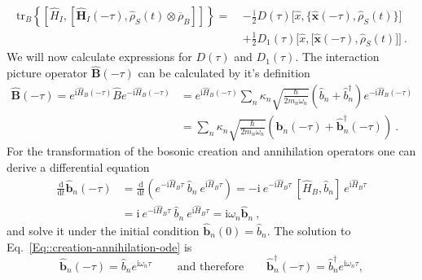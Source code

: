 	\begin{equation}
		\begin{split}
			\text{tr}_B \left\{  \left[{\hat{H}}_I, \left[{\boldsymbol{\hat{H}}}_I(- \tau), {\hat{\rho}}_S(t) \otimes \overline{\rho}_B \right]\right]  \right\} =	~&-\frac{\mathrm{i}}{2} D(\tau) \Big[\hat{x}, \big\{\boldsymbol{\hat{x}}(-\tau),  \hat{\rho}_S(t)\big\}\Big] \\
			&+ \frac{1}{2} D_1(\tau) \Big[\hat{x}, \big[\boldsymbol{\hat{x}}(-\tau),  \hat{\rho}_S(t)\big] \Big]~.
		\end{split}
	\end{equation}
	We will now calculate expressions for $D(\tau)$ and $D_1(\tau)$. The interaction picture operator $\boldsymbol{\hat{B}}(-\tau)$ can be calculated by it's definition
	\begin{equation}
		\begin{split}
			\boldsymbol{\hat{B}}(-\tau) =	e^{\mathrm{i} \hat{H}_B (-\tau)} \hat{B} e^{- \mathrm{i} \hat{H}_B (-\tau)} &=	 e^{\mathrm{i} \hat{H}_B (-\tau)} \sum_n \kappa_n \sqrt{\frac{\hbar}{2 m_n \omega_n}} \left(\hat{b}_n + \hat{b}_n^\dagger\right) e^{- \mathrm{i} \hat{H}_B (-\tau)} \\
			&=	\sum_n \kappa_n \sqrt{\frac{\hbar}{2 m_n \omega_n}} \left(\boldsymbol{\hat{b}}_n(-\tau) + \boldsymbol{\hat{b}}_n^\dagger(-\tau) \right)~.
		\end{split}
	\end{equation}
	For the transformation of the bosonic creation and annihilation operators one can derive a differential equation
	\begin{equation} \label{Eq::creation-annihilation-ode}
		\begin{split}
			\frac{\text{d}}{\text{d}t} \boldsymbol{\hat{b}}_n(-\tau) &=	\frac{\text{d}}{\text{d}t} \left(e^{- \mathrm{i} \hat{H}_B \tau}~ \hat{b}_n~e^{ \mathrm{i} \hat{H}_B \tau}\right) = -\mathrm{i}~e^{- \mathrm{i} \hat{H}_B \tau}~ \left[\hat{H}_B, \hat{b}_n\right]~e^{\mathrm{i} \hat{H}_B \tau} \\
			&=	\mathrm{i}~e^{- \mathrm{i} \hat{H}_B \tau}~ \hat{b}_n~e^{\mathrm{i} \hat{H}_B \tau}  =	\mathrm{i}\omega_n \boldsymbol{\hat{b}}_n~,
		\end{split}
	\end{equation}
	and solve it under the initial condition $\boldsymbol{\hat{b}}_n(0) = \hat{b}_n	$. The solution to Eq.~\eqref{Eq::creation-annihilation-ode} is
	\begin{equation}
		\boldsymbol{\hat{b}}_n(-\tau) = \hat{b}_n e^{\mathrm{i}\omega_n \tau}~ \qquad \text{and therefore} \qquad \boldsymbol{\hat{b}}^{\dagger}_n(-\tau) = \hat{b}_n^\dagger e^{\mathrm{i}\omega_n \tau},
	\end{equation}
